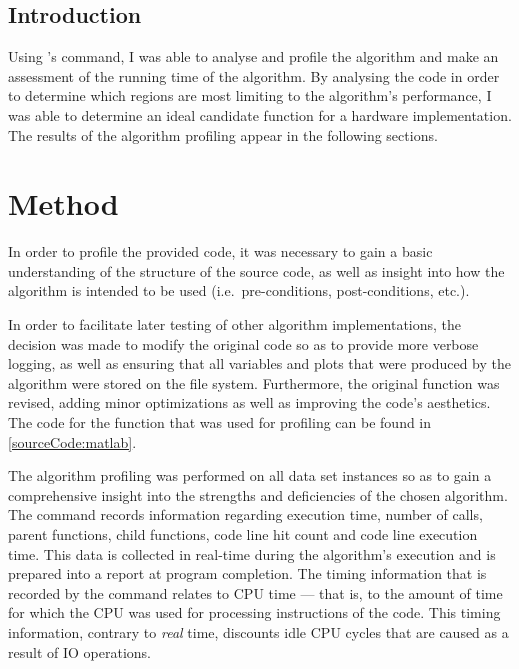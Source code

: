 \subsection{Introduction}
\label{profiling:matlab:introduction}
Using 's  command, I was able to analyse and
profile the  algorithm and make
an assessment of the running time of the algorithm. By analysing the code in
order to determine which regions are most limiting to the algorithm's
performance, I was able to determine an ideal candidate function for a hardware
implementation. The results of the algorithm profiling appear in the following
sections.

\section{Method}
\label{profiling:matlab:method}
In order to profile the provided  code, it was necessary to
gain a basic understanding of the structure of the source code, as well as
insight into how the algorithm is intended to be used (i.e.\ pre-conditions,
post-conditions, etc.).

In order to facilitate later testing of other algorithm implementations, the
decision was made to modify the original code so as to provide more verbose
logging, as well as ensuring that all variables and plots that were produced by
the algorithm were stored on the file system. Furthermore, the original
 function was revised, adding minor
optimizations as well as improving the code's aesthetics. The 
code for the  function that was used for
profiling can be found in \autoref{sourceCode:matlab}.

The algorithm profiling was performed on all data set instances so as to gain a
comprehensive insight into the strengths and deficiencies of the chosen
algorithm. The   command records information
regarding execution time, number of calls, parent functions, child functions,
code line hit count and code line execution time. This data is collected in
real-time during the algorithm's execution and is prepared into a report at
program completion. The timing information that is recorded by the
 command relates to \gls{CPU} time --- that is, to the amount
of time for which the \gls{CPU} was used for processing instructions of the
code. This timing information, contrary to \emph{real} time, discounts idle
\gls{CPU} cycles that are caused as a result of \gls{IO} operations.

